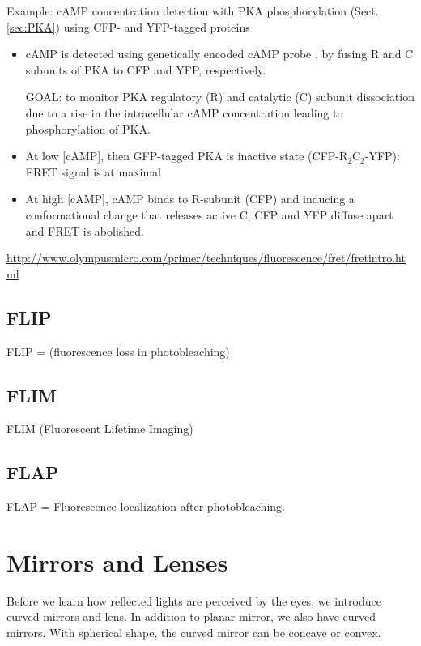 Example: cAMP concentration detection with PKA phosphorylation
(Sect.\ref{sec:PKA}) using CFP- and YFP-tagged proteins
\begin{itemize}
  \item cAMP is detected using genetically encoded cAMP probe \citep{Zaccolo2002,
Nikolaev2006}, by fusing R and C subunits of PKA to CFP and YFP, respectively.
  
GOAL: to monitor PKA regulatory (R) and catalytic (C) subunit dissociation due
to a rise in the intracellular cAMP concentration leading to phosphorylation of
PKA. 
  
  \item At low [cAMP], then GFP-tagged PKA is inactive state
  (CFP-R$_2$C$_2$-YFP): FRET signal is at maximal
  
  \item At high [cAMP], cAMP binds to R-subunit (CFP) and inducing a
  conformational change that releases active C; CFP and YFP diffuse apart and
  FRET is abolished.

\end{itemize}

\url{http://www.olympusmicro.com/primer/techniques/fluorescence/fret/fretintro.html}

\subsection{FLIP}
\label{sec:FLIP}

FLIP = (fluorescence loss in photobleaching) 

\subsection{FLIM}

FLIM (Fluorescent Lifetime Imaging)

\subsection{FLAP}

FLAP = Fluorescence localization after photobleaching.

\label{sec:mirror_lens}
\section{Mirrors and Lenses}

Before we learn how reflected lights are perceived by the eyes, we introduce
curved mirrors and lens. In addition to planar mirror, we also have curved
mirrors. With spherical shape, the curved mirror can be concave or convex.

